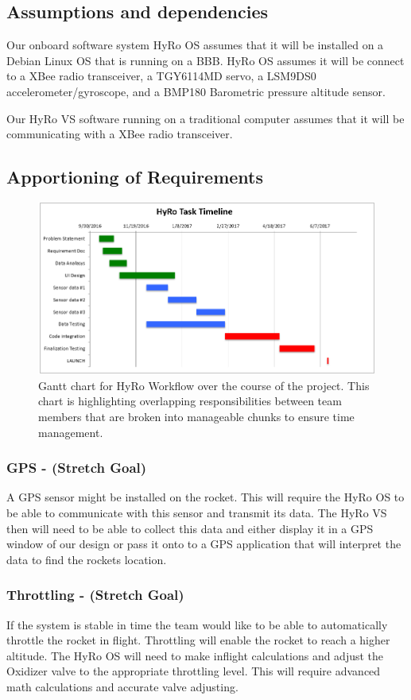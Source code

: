 \documentclass[10pt,draftclsnofoot,onecolumn,retainorgcmds]{IEEEtran}
\begin{document}
\subsection{Assumptions and dependencies}
Our onboard software system HyRo OS assumes that it will be installed on a Debian Linux OS that is running on a BBB.  HyRo OS assumes it will be connect to a XBee radio transceiver, a TGY6114MD servo, a LSM9DS0 accelerometer/gyroscope, and a BMP180 Barometric pressure altitude sensor.\par
Our HyRo VS software running on a traditional computer assumes that it will be communicating with a XBee radio transceiver.

\subsection{Apportioning of Requirements}
\begin{figure}
	\caption{Gantt chart for HyRo Workflow over the course of the project. This chart is highlighting overlapping responsibilities between team members that are broken into manageable chunks to ensure time management. }
	\centering
	\includegraphics[scale=.75]{GanntChart}
\end{figure}
\FloatBarrier
\subsubsection{\bf GPS - (Stretch Goal)} A GPS sensor might be installed on the rocket. This will require the HyRo OS to be able to communicate with this sensor and transmit its data. The HyRo VS then will need to be able to collect this data and either display it in a GPS window of our design or pass it onto to a GPS application that will interpret the data to find the rockets location.
\subsubsection{\bf Throttling - (Stretch Goal)} If the system is stable in time the team would like to be able to automatically throttle the rocket in flight. Throttling will enable the rocket to reach a higher altitude. The HyRo OS will need to make inflight calculations and adjust the Oxidizer valve to the appropriate throttling level. This will require advanced math calculations and accurate valve adjusting.
\end{document}
